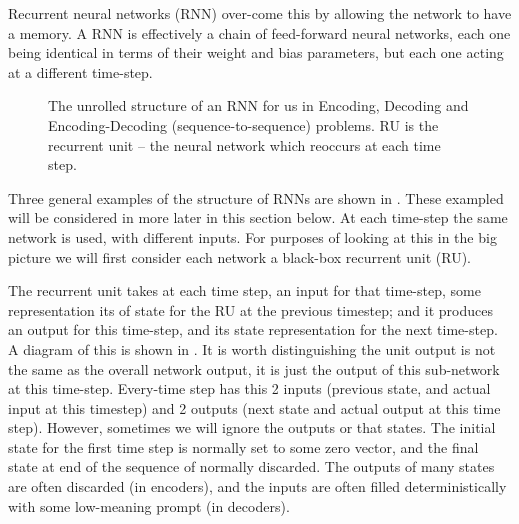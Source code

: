 \documentclass[12pt,parskip]{komatufte}
\begin{document}
Recurrent neural networks (RNN) over-come this by allowing the network to have a memory.
A RNN is effectively a chain of feed-forward neural networks,
each one being identical in terms of their weight and bias parameters,
but each one acting at a different time-step.



\begin{figure}
	\caption{The unrolled structure of an RNN for us in Encoding, Decoding and Encoding-Decoding (sequence-to-sequence) problems. RU is the recurrent unit -- the neural network which reoccurs at each time step.}
	
	\label{fig-rnns}
	
	\resizebox{\textwidth}{!}{}
\end{figure}


Three general examples of the structure of RNNs are shown in .
These exampled will be considered in more later in this section below.
At each time-step the same network is used, with different inputs.
For purposes of looking at this in the big picture we will first consider each network a black-box recurrent unit (RU).




The recurrent unit takes at each time step, an input for that time-step, some representation its of state for the RU at the previous timestep; and it produces an output for this time-step, and its state representation for the next time-step.
A diagram of this is shown in .
It is worth distinguishing the unit output is not the same as the overall network output, it is just the output of this sub-network at this time-step.
Every-time step has this 2 inputs (previous state, and actual input at this timestep) and 2 outputs (next state and actual output at this time step).
However, sometimes we will ignore the outputs or that states.
The initial state for the first time step is normally set to some zero vector,
and the final state at end of the sequence of normally discarded.
The outputs of many states are often discarded (in encoders), and the inputs are often filled deterministically with some low-meaning prompt (in decoders).
\end{document}
